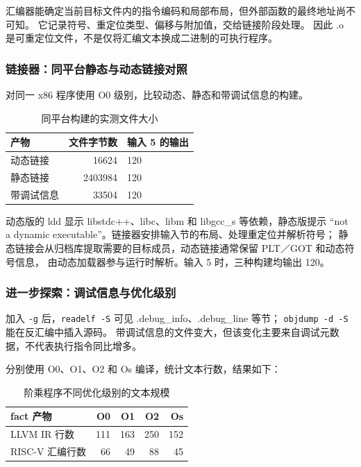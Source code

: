 汇编器能确定当前目标文件内的指令编码和局部布局，但外部函数的最终地址尚不可知。
它记录符号、重定位类型、偏移与附加值，交给链接阶段处理。
因此 .o 是可重定位文件，不是仅将汇编文本换成二进制的可执行程序。


\subsubsection{链接器：同平台静态与动态链接对照}
对同一 x86 程序使用 O0 级别，比较动态、静态和带调试信息的构建。

\begin{table}[htbp]
\centering
\caption{同平台构建的实测文件大小}
\begin{tabular}{lrl}
\toprule 产物 & 文件字节数 & 输入 5 的输出\\\midrule
动态链接 & 16624 & 120\\
静态链接 & 2403984 & 120\\
带调试信息 & 33504 & 120\\
\bottomrule
\end{tabular}
\end{table}

动态版的 ldd 显示 libstdc++、libc、libm 和 libgcc\_s 等依赖，静态版提示
``not a dynamic executable''。链接器安排输入节的布局、处理重定位并解析符号；
静态链接会从归档库提取需要的目标成员，动态链接通常保留 PLT／GOT 和动态符号信息，
由动态加载器参与运行时解析。输入 5 时，三种构建均输出 120。

\subsubsection{进一步探索：调试信息与优化级别}
加入 \texttt{-g} 后，\texttt{readelf -S} 可见 .debug\_info、.debug\_line 等节；
\texttt{objdump -d -S} 能在反汇编中插入源码。
带调试信息的文件变大，但该变化主要来自调试元数据，不代表执行指令同比增多。

分别使用 O0、O1、O2 和 Os 编译，统计文本行数，结果如下：

\begin{table}[htbp]
\centering
\caption{阶乘程序不同优化级别的文本规模}
\begin{tabular}{lrrrr}
\toprule fact 产物 & O0 & O1 & O2 & Os\\\midrule
LLVM IR 行数 & 111 & 163 & 250 & 152\\
RISC-V 汇编行数 & 66 & 49 & 88 & 45\\
\bottomrule
\end{tabular}

\end{table}

